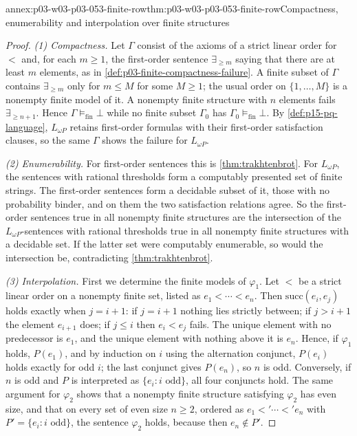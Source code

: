 \begin{annexitem}{annex:p03-w03-p03-053-finite-row}{thm:p03-w03-p03-053-finite-row}{Compactness, enumerability and interpolation over finite structures}
\begin{proof}
\emph{(1) Compactness.} Let \(\Gamma\) consist of the axioms of a strict
linear order for \(<\) and, for each \(m\ge1\), the first-order sentence
\(\exists_{\ge m}\) saying that there are at least \(m\) elements, as in
\cref{def:p03-finite-compactness-failure}. A finite subset of \(\Gamma\)
contains \(\exists_{\ge m}\) only for \(m\le M\) for some \(M\ge1\); the
usual order on \(\{1,\ldots,M\}\) is a nonempty finite model of it. A
nonempty finite structure with \(n\) elements fails
\(\exists_{\ge n+1}\). Hence \(\Gamma\models_{\mathrm{fin}}\bot\) while
no finite subset \(\Gamma_0\) has \(\Gamma_0\models_{\mathrm{fin}}\bot\).
By \cref{def:p15-pq-language}, \(L_{\omega P}\) retains first-order
formulas with their first-order satisfaction clauses, so the same
\(\Gamma\) shows the failure for \(L_{\omega P}\).

\emph{(2) Enumerability.} For first-order sentences this is
\cref{thm:trakhtenbrot}. For \(L_{\omega P}\), the sentences with rational
thresholds form a computably presented set of finite strings. The
first-order sentences form a decidable subset of it, those with no
probability binder, and on them the two satisfaction relations agree. So
the first-order sentences true in all nonempty finite structures are the
intersection of the \(L_{\omega P}\)-sentences with rational thresholds
true in all nonempty finite structures with a decidable set. If the latter
set were computably enumerable, so would the intersection be,
contradicting \cref{thm:trakhtenbrot}.

\emph{(3) Interpolation.} First we determine the finite models of
\(\varphi_1\). Let \(<\) be a strict linear order on a nonempty finite
set, listed as \(e_1<\cdots<e_n\). Then \(\mathrm{succ}(e_i,e_j)\) holds
exactly when \(j=i+1\): if \(j=i+1\) nothing lies strictly between; if
\(j>i+1\) the element \(e_{i+1}\) does; if \(j\le i\) then
\(e_i<e_j\) fails. The unique element with no predecessor is \(e_1\), and
the unique element with nothing above it is \(e_n\). Hence, if
\(\varphi_1\) holds, \(P(e_1)\), and by induction on \(i\) using the
alternation conjunct, \(P(e_i)\) holds exactly for odd \(i\); the last
conjunct gives \(P(e_n)\), so \(n\) is odd. Conversely, if \(n\) is odd
and \(P\) is interpreted as \(\{e_i:i\text{ odd}\}\), all four conjuncts
hold. The same argument for \(\varphi_2\) shows that a nonempty finite
structure satisfying \(\varphi_2\) has even size, and that on every set
of even size \(n\ge2\), ordered as \(e_1<'\cdots<'e_n\) with
\(P'=\{e_i:i\text{ odd}\}\), the sentence \(\varphi_2\) holds, because
then \(e_n\notin P'\).


\end{proof}
\end{annexitem}
